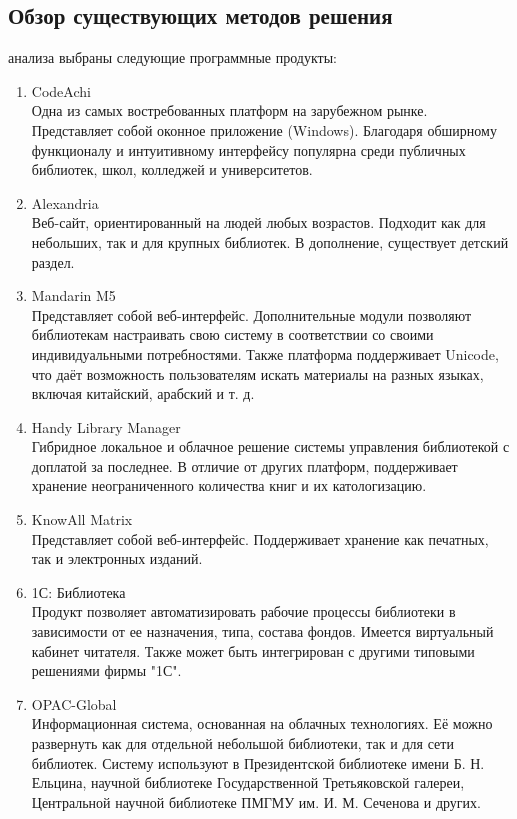 \documentclass[./intro.tex]{subfiles}
\begin{document}
\subsection{Обзор существующих методов решения}
 анализа выбраны следующие программные продукты:
\begin{enumerate}
    \item CodeAchi \cite{Codeachi} \\
    Одна из самых востребованных платформ на зарубежном рынке. Представляет собой оконное приложение (Windows). Благодаря обширному функционалу и интуитивному интерфейсу популярна среди публичных библиотек, школ, колледжей и университетов.
    \item Alexandria \cite{Alexandria} \\
    Веб-сайт, ориентированный на людей любых возрастов. Подходит как для небольших, так и для крупных библиотек. В дополнение, существует детский раздел.
    \item Mandarin M5 \cite{Mandarin} \\
    Представляет собой веб-интерфейс. Дополнительные модули позволяют библиотекам настраивать свою систему в соответствии со своими индивидуальными потребностями. Также платформа поддерживает Unicode, что даёт возможность пользователям искать материалы на разных языках, включая китайский, арабский и т. д.
    \item Handy Library Manager \cite{Handy} \\
    Гибридное локальное и облачное решение системы управления библиотекой с доплатой за последнее. В отличие от других платформ, поддерживает хранение неограниченного количества книг и их катологизацию. 
    \item KnowAll Matrix \cite{KnowAll} \\
    Представляет собой веб-интерфейс. Поддерживает хранение как печатных, так и электронных изданий.
    \item 1С: Библиотека \cite{1C} \\
    Продукт позволяет автоматизировать рабочие процессы библиотеки в зависимости от ее назначения, типа, состава фондов. Имеется виртуальный кабинет читателя. Также может быть интегрирован с другими типовыми решениями фирмы "1С".
    \item OPAC-Global \cite{OPAC} \\
    Информационная система, основанная на облачных технологиях. Её можно развернуть как для отдельной небольшой библиотеки, так и для сети библиотек. Систему используют в Президентской библиотеке имени Б. Н. Ельцина, научной библиотеке Государственной Третьяковской галереи, Центральной научной библиотеке ПМГМУ им. И. М. Сеченова и других.

\end{enumerate}
\end{document}

